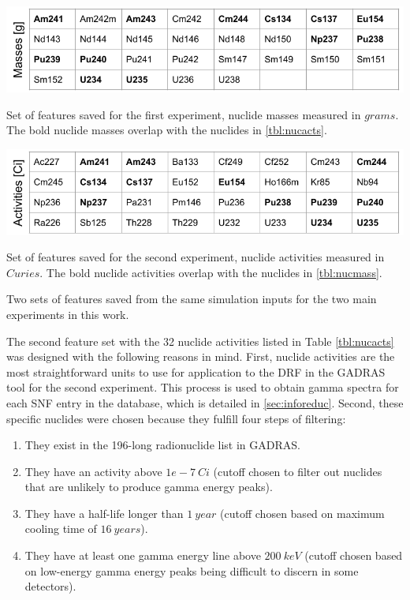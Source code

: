 \begin{table}[!h]
  \centering
  \begin{subtable}{\linewidth}
    \centering
    \includegraphics[width=\linewidth]{./chapters/method/nucmass_feats.png}
    \caption{Set of features saved for the first experiment, nuclide masses 
             measured in $grams$. The bold nuclide masses overlap with the 
             nuclides in \ref{tbl:nucacts}.}
    \label{tbl:nucmass}
    \vspace*{5mm}
  \end{subtable}
  \begin{subtable}{\linewidth}
    \centering
    \includegraphics[width=\linewidth]{./chapters/method/nucacts_feats.png}
    \caption{Set of features saved for the second experiment, nuclide activities
             measured in $Curies$. The bold nuclide activities overlap with the 
             nuclides in \ref{tbl:nucmass}.}
    \label{tbl:nucacts}
  \end{subtable}%
  \caption{Two sets of features saved from the same simulation inputs for the 
           two main experiments in this work.}
  \label{tbl:nucfeats}
\end{table}

The second feature set with the 32 nuclide activities listed in Table
\ref{tbl:nucacts} was designed with the following reasons in mind. First,
nuclide activities are the most straightforward units to use for application to
the \gls{DRF} in the \gls{GADRAS} tool for the second experiment. This process
is used to obtain gamma spectra for each \gls{SNF} entry in the database, which
is detailed in \ref{sec:inforeduc}.  Second, these specific nuclides were
chosen because they fulfill four steps of filtering:
\begin{enumerate}
  \item They exist in the 196-long radionuclide list in \gls{GADRAS}.
  \item They have an activity above $1e-7\:Ci$ (cutoff chosen to filter out
  nuclides that are unlikely to produce gamma energy peaks).
  \item They have a half-life longer than $1\:year$ (cutoff chosen based on
  maximum cooling time of $16\:years$).
  \item They have at least one gamma energy line above $200\:keV$ (cutoff
  chosen based on low-energy gamma energy peaks being difficult to discern in
  some detectors).
\end{enumerate}

